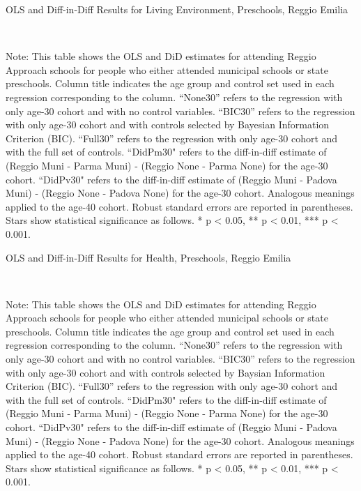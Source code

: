 \begin{landscape}
\begin{table}[H] \caption{OLS and Diff-in-Diff Results for Living Environment, Preschools, Reggio Emilia} \label{ols-L-reg}
\scalebox{0.85}{
}
\vspace{1ex} \\
\footnotesize\raggedright{Note: This table shows the OLS and DiD estimates for attending Reggio Approach schools for people who either attended municipal schools or state preschools. Column title indicates the age group and control set used in each regression corresponding to the column. ``None30'' refers to the regression with only age-30 cohort and with no control variables. ``BIC30'' refers to the regression with only age-30 cohort and with controls selected by Bayesian Information Criterion (BIC). ``Full30'' refers to the regression with only age-30 cohort and with the full set of controls. ``DidPm30" refers to the diff-in-diff estimate of (Reggio Muni - Parma Muni) - (Reggio None - Parma None) for the age-30 cohort. ``DidPv30" refers to the diff-in-diff estimate of (Reggio Muni - Padova Muni) - (Reggio None - Padova None) for the age-30 cohort. Analogous meanings applied to the age-40 cohort. Robust standard errors are reported in parentheses. Stars show statistical significance as follows. * p < 0.05, ** p < 0.01, *** p < 0.001.}
\end{table}


\begin{table}[H] \caption{OLS and Diff-in-Diff Results for Health, Preschools, Reggio Emilia} \label{ols-H-reg}
\scalebox{0.85}{
}
\vspace{1ex} \\
\footnotesize\raggedright{Note: This table shows the OLS and DiD estimates for attending Reggio Approach schools for people who either attended municipal schools or state preschools. Column title indicates the age group and control set used in each regression corresponding to the column. ``None30'' refers to the regression with only age-30 cohort and with no control variables. ``BIC30'' refers to the regression with only age-30 cohort and with controls selected by Baysian Information Criterion (BIC). ``Full30'' refers to the regression with only age-30 cohort and with the full set of controls. ``DidPm30" refers to the diff-in-diff estimate of (Reggio Muni - Parma Muni) - (Reggio None - Parma None) for the age-30 cohort. ``DidPv30" refers to the diff-in-diff estimate of (Reggio Muni - Padova Muni) - (Reggio None - Padova None) for the age-30 cohort. Analogous meanings applied to the age-40 cohort. Robust standard errors are reported in parentheses. Stars show statistical significance as follows. * p < 0.05, ** p < 0.01, *** p < 0.001.}
\end{table}


\end{landscape}
